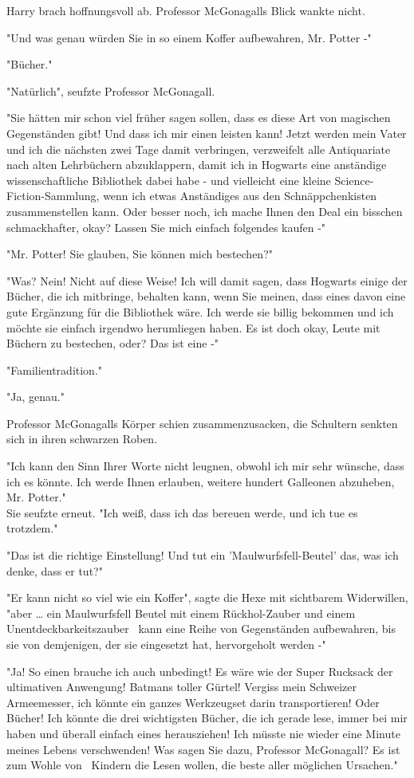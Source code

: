 {Harry brach hoffnungsvoll ab. Professor McGonagalls Blick wankte nicht.

"Und was genau würden Sie in so einem Koffer aufbewahren, Mr. Potter -"

"Bücher."

"Natürlich", seufzte Professor McGonagall.

"Sie hätten mir schon viel früher sagen sollen, dass es diese Art von magischen Gegenständen gibt! Und dass ich mir einen leisten kann! Jetzt werden mein Vater und ich die nächsten zwei Tage damit verbringen, verzweifelt alle Antiquariate nach alten Lehrbüchern abzuklappern, damit ich in Hogwarts eine anständige wissenschaftliche Bibliothek dabei habe - und vielleicht eine kleine Science-Fiction-Sammlung, wenn ich etwas Anständiges aus den Schnäppchenkisten zusammenstellen kann. Oder besser noch, ich mache Ihnen den Deal ein bisschen schmackhafter, okay? Lassen Sie mich einfach folgendes kaufen -"

"Mr. Potter! Sie glauben, Sie können mich bestechen?"

"Was? Nein! Nicht auf diese Weise! Ich will damit sagen, dass Hogwarts einige der Bücher, die ich mitbringe, behalten kann, wenn Sie meinen, dass eines davon eine gute Ergänzung für die Bibliothek wäre. Ich werde sie billig bekommen und ich möchte sie einfach irgendwo herumliegen haben. Es ist doch okay, Leute mit Büchern zu bestechen, oder? Das ist eine -"

"Familientradition."

"Ja, genau."

Professor McGonagalls Körper schien zusammenzusacken, die Schultern senkten sich in ihren schwarzen Roben.

"Ich kann den Sinn Ihrer Worte nicht leugnen, obwohl ich mir sehr wünsche, dass ich es könnte. Ich werde Ihnen erlauben, weitere hundert Galleonen abzuheben, Mr. Potter."\\ Sie seufzte erneut. "Ich weiß, dass ich das bereuen werde, und ich tue es trotzdem."

"Das ist die richtige Einstellung! Und tut ein 'Maulwurfsfell-Beutel' das, was ich denke, dass er tut?"

"Er kann nicht so viel wie ein Koffer", sagte die Hexe mit sichtbarem Widerwillen, "aber … ein Maulwurfsfell Beutel mit einem Rückhol-Zauber und einem Unentdeckbarkeitszauber ~kann eine Reihe von Gegenständen aufbewahren, bis sie von demjenigen, der sie eingesetzt hat, hervorgeholt werden -"

"Ja! So einen brauche ich auch unbedingt! Es wäre wie der Super Rucksack der ultimativen Anwengung! Batmans toller Gürtel! Vergiss mein Schweizer Armeemesser, ich könnte ein ganzes Werkzeugset darin transportieren! Oder Bücher! Ich könnte die drei wichtigsten Bücher, die ich gerade lese, immer bei mir haben und überall einfach eines herausziehen! Ich müsste nie wieder eine Minute meines Lebens verschwenden! Was sagen Sie dazu, Professor McGonagall? Es ist zum Wohle von ~Kindern die Lesen wollen, die beste aller möglichen Ursachen."

}
